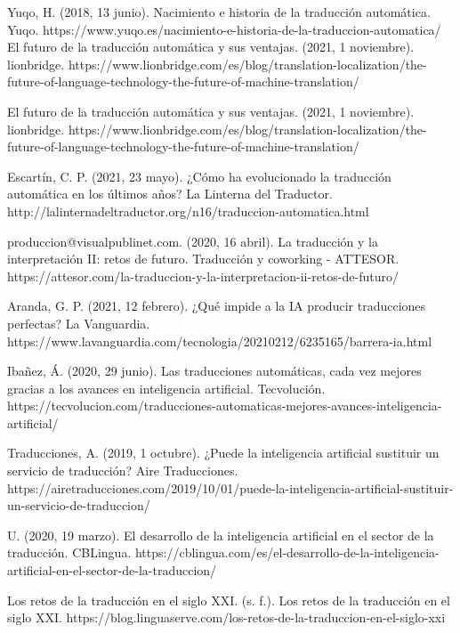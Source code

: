 \documentclass[a4paper]{article}
\theoremstyle{plain}
\theoremstyle{definition}
\begin{document}
	
	

	
	\newpage
    \usepackage{biblatex}

    \begin{thebibliography}{0}
        \bibitem Yuqo, H. (2018, 13 junio). Nacimiento e historia de la traducción automática. Yuqo. https://www.yuqo.es/nacimiento-e-historia-de-la-traduccion-automatica/
        \bibitem El futuro de la traducción automática y sus ventajas. (2021, 1 noviembre). lionbridge. https://www.lionbridge.com/es/blog/translation-localization/the-future-of-language-technology-the-future-of-machine-translation/
        
       \bibitem El futuro de la traducción automática y sus ventajas. (2021, 1 noviembre). lionbridge. https://www.lionbridge.com/es/blog/translation-localization/the-future-of-language-technology-the-future-of-machine-translation/
       
       \bibitem  Escartín, C. P. (2021, 23 mayo). ¿Cómo ha evolucionado la traducción automática en los últimos años? La Linterna del Traductor. http://lalinternadeltraductor.org/n16/traduccion-automatica.html
       
       \bibitem produccion@visualpublinet.com. (2020, 16 abril). La traducción y la interpretación II: retos de futuro. Traducción y coworking - ATTESOR. https://attesor.com/la-traduccion-y-la-interpretacion-ii-retos-de-futuro/
       
       \bibitem Aranda, G. P. (2021, 12 febrero). ¿Qué impide a la IA producir traducciones perfectas? La Vanguardia. https://www.lavanguardia.com/tecnologia/20210212/6235165/barrera-ia.html
       
       
       \bibitem Ibañez, Á. (2020, 29 junio). Las traducciones automáticas, cada vez mejores gracias a los avances en inteligencia artificial. Tecvolución. https://tecvolucion.com/traducciones-automaticas-mejores-avances-inteligencia-artificial/
       
       \bibitem Traducciones, A. (2019, 1 octubre). ¿Puede la inteligencia artificial sustituir un servicio de traducción? Aire Traducciones. https://airetraducciones.com/2019/10/01/puede-la-inteligencia-artificial-sustituir-un-servicio-de-traduccion/
       
       \bibitem U. (2020, 19 marzo). El desarrollo de la inteligencia artificial en el sector de la traducción. CBLingua. https://cblingua.com/es/el-desarrollo-de-la-inteligencia-artificial-en-el-sector-de-la-traduccion/
       
       \bibitem Los retos de la traducción en el siglo XXI. (s. f.). Los retos de la traducción en el siglo XXI. https://blog.linguaserve.com/los-retos-de-la-traduccion-en-el-siglo-xxi
       
       
       
       
    \end{thebibliography}
    
    
    
    
    
    
    
    
   
    

	
\end{document}
